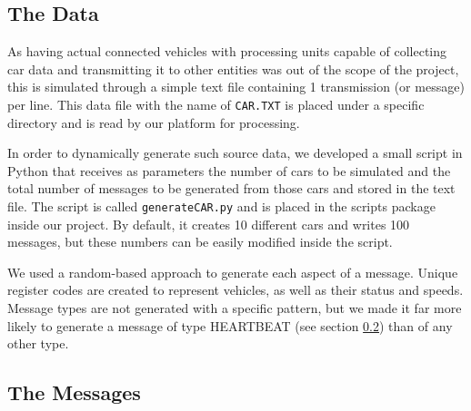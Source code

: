 \documentclass[12pt]{article}
\begin{document}
\subsection{The Data} %

As having actual connected vehicles with processing units capable of collecting car data and transmitting it to other entities was out of the scope of the project, 
this is simulated through a simple text file containing 1 transmission (or message) per line.
This data file with the name of \texttt{CAR.TXT} is placed under a specific directory and is read by our platform for processing.

In order to dynamically generate such source data, we developed a small script in Python that receives as parameters the number of cars to be simulated and the 
total number of messages to be generated from those cars and stored in the text file.
The script is called \texttt{generateCAR.py} and is placed in the scripts package inside our project.
By default, it creates 10 different cars and writes 100 messages, but these numbers can be easily modified inside the script. 

We used a random-based approach to generate each aspect of a message.
Unique register codes are created to represent vehicles, as well as their status and speeds.
Message types are not generated with a specific pattern, but we made it far more likely to generate a message of type HEARTBEAT (see section \ref{messages}) 
than of any other type.


\subsection{The Messages} \label{messages} %
\end{document}
